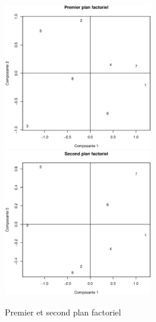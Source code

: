 \documentclass{article}
\begin{document}

\begin{figure}[H]
\centering
\includegraphics[width=6.5cm]{./img/q-5_premier_plan_fac.eps}
\includegraphics[width=6.5cm]{./img/q-5_second_plan_fac.eps}
\caption{Premier et second plan factoriel}
\label{q.5.premier_plan_fac}
\end{figure}

\end{document}
